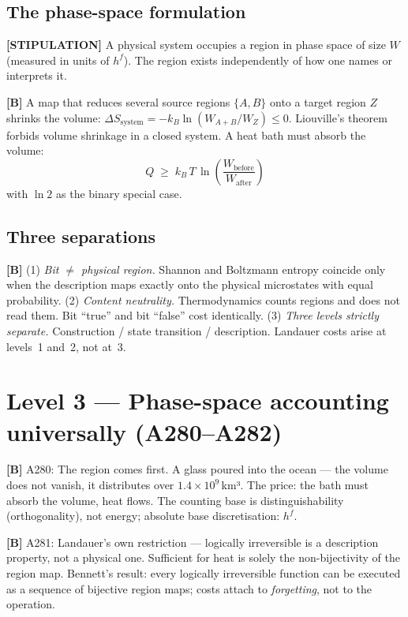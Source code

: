 \subsection{The phase-space formulation}

\textbf{[STIPULATION]} A physical system occupies a region in phase
space of size $W$ (measured in units of $h^f$). The region exists
independently of how one names or interprets it.

\textbf{[B]} A map that reduces several source regions $\{A, B\}$ onto
a target region $Z$ shrinks the volume:
$\Delta S_\text{system} = -k_B \ln(W_{A+B}/W_Z) \le 0$.
Liouville's theorem forbids volume shrinkage in a closed system.
A heat bath must absorb the volume:
\[
  \boxed{Q \;\ge\; k_B\,T\,\ln\!\left(\frac{W_\text{before}}{W_\text{after}}\right)}
\]
with $\ln 2$ as the binary special case.

\subsection{Three separations}

\textbf{[B]}
(1) \emph{Bit $\ne$ physical region.} Shannon and Boltzmann entropy
coincide only when the description maps exactly onto the physical
microstates with equal probability.
(2) \emph{Content neutrality.} Thermodynamics counts regions and does
not read them. Bit \enquote{true} and bit \enquote{false} cost
identically.
(3) \emph{Three levels strictly separate.} Construction / state
transition / description. Landauer costs arise at levels~1 and~2,
not at~3.

\section{Level 3 --- Phase-space accounting universally (A280--A282)}

\textbf{[B]} A280: The region comes first. A glass poured into the
ocean --- the volume does not vanish, it distributes over
$1{.}4 \times 10^9$\,km³. The price: the bath must absorb the volume,
heat flows. The counting base is distinguishability (orthogonality),
not energy; absolute base discretisation: $h^f$.

\textbf{[B]} A281: Landauer's own restriction --- logically irreversible
is a description property, not a physical one. Sufficient for heat is
solely the non-bijectivity of the region map. Bennett's result: every
logically irreversible function can be executed as a sequence of
bijective region maps; costs attach to \emph{forgetting}, not to the
operation.

